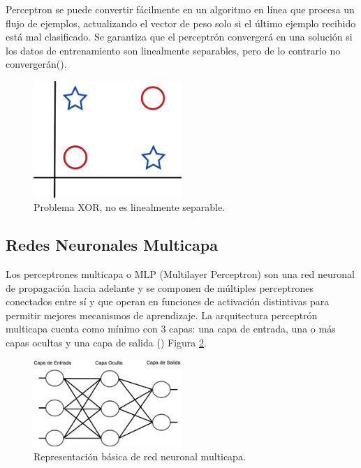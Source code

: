 Perceptron se puede convertir fácilmente en un algoritmo en línea que procesa un flujo de ejemplos, actualizando el vector de peso solo si el último ejemplo recibido está mal clasificado. Se garantiza que el perceptrón convergerá en una solución si los datos de entrenamiento son linealmente separables, pero de lo contrario no convergerán(\cite{flach2012Machine}).

\begin{figure}[H]
    \centering
    \includegraphics[width=0.5\textwidth]{MarcoTeorico/imgs/XOR.png}
    \caption{Problema XOR, no es linealmente separable.}
    \label{fig:xor}
\end{figure}


\subsection{Redes Neuronales Multicapa}


Los perceptrones multicapa o MLP (Multilayer Perceptron) son una red neuronal de propagación hacia adelante y se componen de múltiples perceptrones conectados entre sí y que operan en funciones de activación distintivas para permitir mejores mecanismos de aprendizaje. La arquitectura perceptrón multicapa cuenta como mínimo con 3 capas: una capa de entrada, una o más capas ocultas y una capa de salida (\cite{swamynathan2017Mastering}) Figura \ref{fig:mlp}.

\begin{figure}[H]
    \centering
    \includegraphics[width=0.5\textwidth]{MarcoTeorico/imgs/MLP.png}
    \caption{Representación básica de red neuronal multicapa.}
    \label{fig:mlp}
\end{figure}

